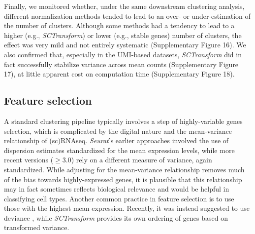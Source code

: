 \documentclass{bmcart}
\begin{document}
Finally, we monitored whether, under the same downstream clustering analysis, different normalization methods tended to lead to an over- or under-estimation of the number of clusters. Although some methods had a tendency to lead to a higher (e.g., \textit{SCTransform}) or lower (e.g., stable genes) number of clusters, the effect was very mild and not entirely systematic (Supplementary Figure 16). We also confirmed that, especially in the UMI-based datasets, \textit{SCTransform} did in fact successfully stabilize variance across mean counts (Supplementary Figure 17), at little apparent cost on computation time (Supplementary Figure 18).

\subsection*{Feature selection}

A standard clustering pipeline typically involves a step of highly-variable genes selection, which is complicated by the digital nature and the mean-variance relationship of (sc)RNAseq. \textit{Seurat}'s earlier approaches involved the use of dispersion estimates standardized for the mean expression levels, while more recent versions ($\geq$3.0) rely on a different measure of variance, again standardized. While adjusting for the mean-variance relationship removes much of the bias towards highly-expressed genes, it is plausible that this relationship may in fact sometimes reflects biological relevance and would be helpful in classifying cell types. Another common practice in feature selection is to use those with the highest mean expression. Recently, it was instead suggested to use deviance \cite{townesGlmpca2019}, while \textit{SCTransform} provides its own ordering of genes based on transformed variance.
\end{document}
